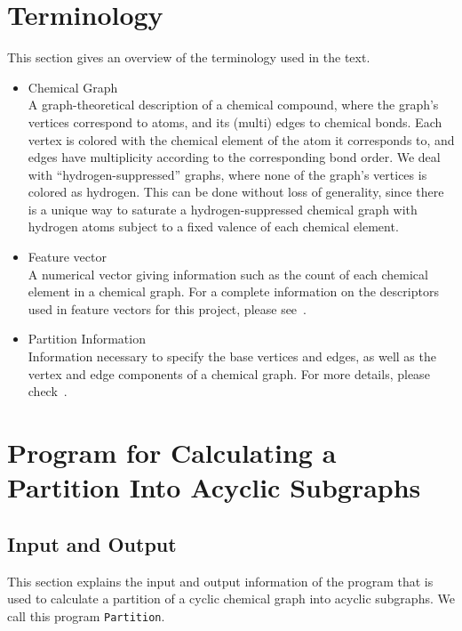 \documentclass[11pt,titlepage,dvipdfmx,twoside]{book}
\begin{document}
\section{Terminology}
\label{chap:term}

This section gives an overview of the terminology used in the text.
%
\begin{itemize}
%
\item Chemical Graph\\
A graph-theoretical description of a chemical compound, 
where the graph's vertices correspond to atoms, and
its (multi) edges to chemical bonds.
Each vertex is colored with the chemical element of the atom it corresponds to,
and edges have multiplicity according to the corresponding bond order.
We deal with ``hydrogen-suppressed'' graphs, 
where none of the graph's vertices is colored as hydrogen.
This can be done without loss of generality,
since there is a unique way to saturate a hydrogen-suppressed chemical graph 
with hydrogen atoms subject to a fixed valence of each chemical element.


\item Feature vector\\
A numerical vector giving information such as the count of
each chemical element in a chemical graph.
For a complete information on the descriptors used in feature vectors for
this project, please see~\cite{AN20}.



\item Partition Information\\
Information necessary to specify the base vertices and edges, as well as the vertex and edge components
of a chemical graph.
For more details, please check~\cite{AN20}.
\end{itemize}


\section{Program for Calculating a Partition Into Acyclic Subgraphs}
\label{chap: partition}

\subsection{Input and Output}
\label{chap:InOut_p}

This section explains the input and output information of the 
program that is used to calculate a partition of a cyclic chemical graph
into acyclic subgraphs.
We call this program {\tt Partition}.
\end{document}

